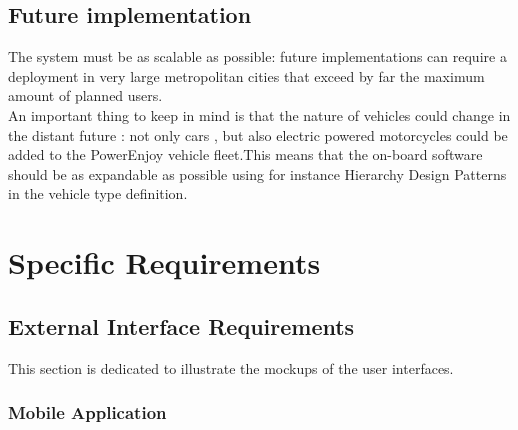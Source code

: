 \documentclass[12pt]{article}
\begin{document}
	\subsection{Future implementation}
	The system must be as scalable as possible: future implementations can require a deployment in very large metropolitan cities that exceed by far the maximum amount of planned users.\\ An important thing to keep in mind is that the nature of vehicles could change in the distant future : not only cars , but also electric powered motorcycles could be added to the PowerEnjoy vehicle fleet.This means that the on-board software should be as expandable as possible using for instance Hierarchy Design Patterns in the vehicle type definition.
	 

\newpage
\FloatBarrier

\section{\Large Specific Requirements}
\subsection{External Interface Requirements}
 This section is dedicated to illustrate the mockups of the user interfaces.
 \FloatBarrier
 \subsubsection{Mobile Application}
 	
\end{document}
